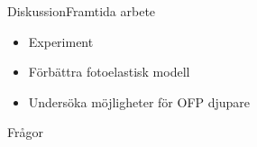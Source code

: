 \documentclass[11pt]{beamer}
\begin{document}
	\begin{frame}{Diskussion}{Framtida arbete}
		\begin{itemize}
			\item Experiment
			\pause
			\item Förbättra fotoelastisk modell
			\pause
			\item Undersöka möjligheter för OFP djupare
		\end{itemize}
	\end{frame}
	
	\begin{frame}
		\centering \huge
		Frågor
	\end{frame}
\end{document}

